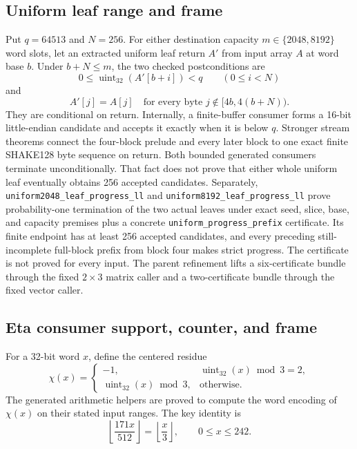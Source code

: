 \documentclass[11pt]{article}
\theoremstyle{definition}
\theoremstyle{plain}
\theoremstyle{remark}
\newcommand{\code}[1]{\nolinkurl{#1}}
\begin{document}
\subsection{Uniform leaf range and frame}

Put $q=64513$ and $N=256$.  For either destination capacity
$m\in\{2048,8192\}$ word slots, let an extracted uniform leaf return $A'$ from
input array $A$ at word base $b$.  Under $b+N\le m$, the two checked
postconditions are
\[
  0\le \operatorname{uint}_{32}(A'[b+i])<q
  \qquad(0\le i<N)
\]
and
\[
  A'[j]=A[j]
  \quad\text{for every byte }j\notin[4b,4(b+N)).
\]
They are conditional on return.  Internally, a finite-buffer consumer forms a
16-bit little-endian candidate and accepts it exactly when it is below $q$.
Stronger stream theorems connect the four-block prelude and every later block
to one exact finite SHAKE128 byte sequence on return.  Both bounded generated
consumers terminate unconditionally.  That fact does not prove that either
whole uniform leaf eventually obtains 256 accepted candidates.  Separately,
\code{uniform2048_leaf_progress_ll} and
\code{uniform8192_leaf_progress_ll} prove probability-one termination of the
two actual leaves under exact seed, slice, base, and capacity premises plus a
concrete \code{uniform_progress_prefix} certificate.  Its finite endpoint has
at least 256 accepted candidates, and every preceding still-incomplete
full-block prefix from block four makes strict progress.  The certificate is
not proved for every input.  The parent refinement lifts a six-certificate
bundle through the fixed \(2\times3\) matrix caller and a two-certificate
bundle through the fixed vector caller.

\subsection{Eta consumer support, counter, and frame}

For a 32-bit word $x$, define the centered residue
\[
  \chi(x)=
  \begin{cases}
    -1,&\operatorname{uint}_{32}(x)\bmod3=2,\\
    \operatorname{uint}_{32}(x)\bmod3,&\text{otherwise}.
  \end{cases}
\]
The generated arithmetic helpers are proved to compute the word encoding of
$\chi(x)$ on their stated input ranges.  The key identity is
\[
  \left\lfloor\frac{171x}{512}\right\rfloor
  =\left\lfloor\frac{x}{3}\right\rfloor,
  \qquad 0\le x\le242.
\]
\end{document}
